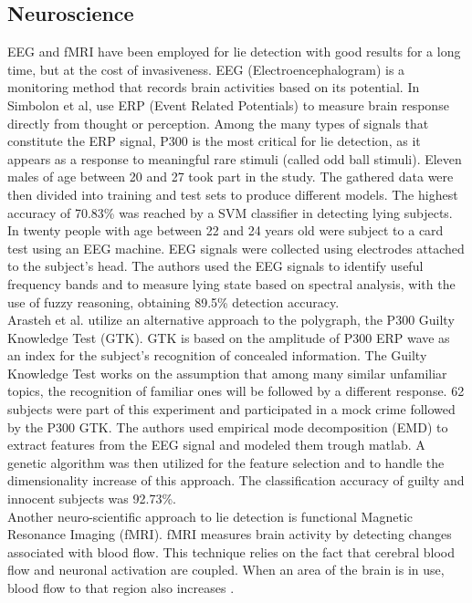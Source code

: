\subsection*{Neuroscience}
EEG and fMRI have been employed for lie detection with good results for a long time, but at the cost of invasiveness.
EEG (Electroencephalogram) is a monitoring method that records brain activities based on its potential. 
In \cite{7440177} Simbolon et al, use ERP (Event Related Potentials) to measure brain response directly from thought or perception. Among the many types of signals that constitute the ERP signal, P300 is the most critical for lie detection, as it appears as a response to meaningful rare stimuli (called odd ball stimuli). Eleven males of age between 20 and 27 took part in the study. The gathered data were then divided into training and test sets to produce different models. The highest accuracy of 70.83\% was reached by a SVM classifier in detecting lying subjects.\\
In \cite{Lai2017} twenty people with age between 22 and 24 years old were subject to a card test using an EEG machine. EEG signals were collected using electrodes attached to the subject’s head. The authors used the EEG signals to identify useful frequency bands and to measure lying state based on spectral analysis, with the use of fuzzy reasoning, obtaining 89.5\% detection accuracy. \\
Arasteh et al. \cite{7511728} utilize an alternative approach to the polygraph, the P300 Guilty Knowledge Test (GTK). GTK is based on the amplitude of P300 ERP wave as an index for the subject's recognition of concealed information. The Guilty Knowledge Test works on the assumption that among many similar unfamiliar topics, the recognition of familiar ones will be followed by a different response. 62 subjects were part of this experiment and participated in a mock crime followed by the P300 GTK. The authors used empirical mode decomposition (EMD) to extract features from the EEG signal and modeled them trough matlab. A genetic algorithm was then utilized for the feature selection and to handle the dimensionality increase of this approach. The classification accuracy of guilty and innocent subjects was 92.73\%. \\
Another neuro-scientific approach to lie detection is functional Magnetic Resonance Imaging (fMRI). fMRI measures brain activity by detecting changes associated with blood flow. This technique relies on the fact that cerebral blood flow and neuronal activation are coupled. When an area of the brain is in use, blood flow to that region also increases \cite{WikifMRI}.\\
